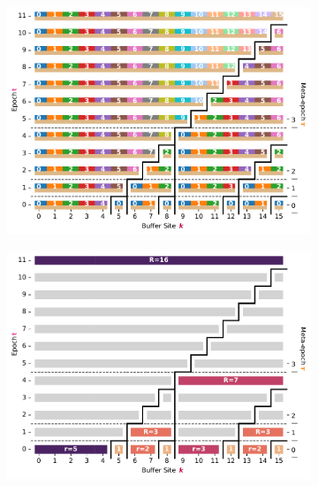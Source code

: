 \begin{figure}[htbp!]
  \centering
  \begin{subfigure}{0.5\textwidth}
  \includegraphics[width=\textwidth, clip, trim={0 1.25cm 1.25cm 0}]{binder/teeplots/20/surface-size=16+viz=site-reservation-at-ranks-heatmap+ext=}
  \end{subfigure}%
  \begin{subfigure}{0.5\textwidth}
  \includegraphics[width=\textwidth, clip, trim={1.25cm 1.25cm 0 0}]{binder/teeplots/20/plotter=size+surface-size=16+viz=site-reservation-at-ranks-heatmap+ext=}
  \end{subfigure}

\begin{subfigure}{\linewidth}
\begin{tikzpicture}[scale=\linewidth/50cm]


\end{tikzpicture}
\end{subfigure}
\end{figure}
